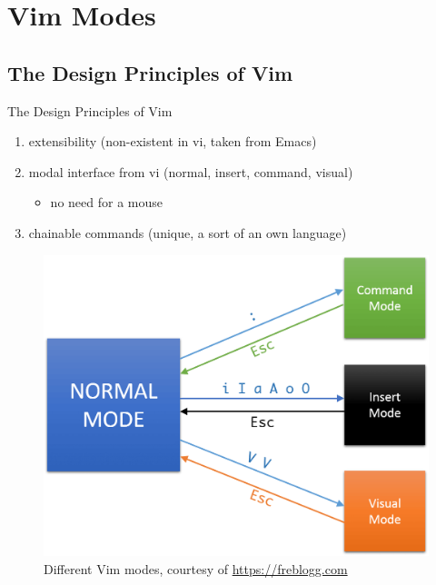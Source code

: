 \documentclass[xcolor=x11names,compress,t]{beamer}
\renewcommand{\(}{\begin{columns}[T]}
\renewcommand{\)}{\end{columns}}
\newcommand{\<}[1]{\begin{column}{#1}}
\renewcommand{\>}{\end{column}}
\newenvironment{slide}[1]{\subsection{#1} \begin{frame}{#1}}{\end{frame}}
\begin{document}
\section{Vim Modes}
\begin{slide}{The Design Principles of Vim}
    \begin{enumerate} 
        \item extensibility (non-existent in vi, taken from Emacs)
        \item modal interface from vi (normal, insert, command, visual)
            \begin{itemize}
                \item no need for a mouse
            \end{itemize}
        \item chainable commands (unique, a sort of an own language)
    \end{enumerate}
    \begin{figure}
        \includegraphics[height=0.5\textheight]{vim-modes}
        \caption{Different Vim modes, courtesy of \url{https://freblogg.com}}
    \end{figure}
\end{slide}
\end{document}
